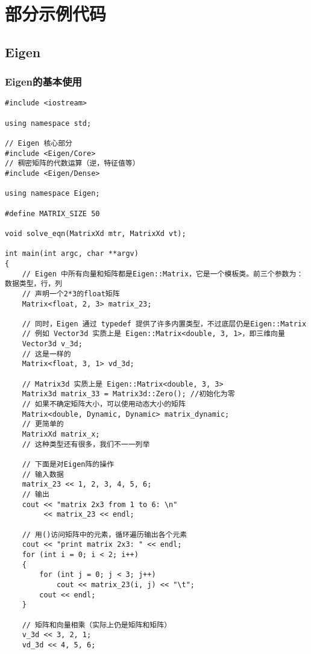 \chapter{部分示例代码}
\label{code}
\thispagestyle{empty}

\section{Eigen}
\label{Eigen}
\subsection{Eigen的基本使用}
\label{Eigen1}
\begin{lstlisting}[style=C++]
#include <iostream>

using namespace std;

// Eigen 核心部分
#include <Eigen/Core>
// 稠密矩阵的代数运算（逆，特征值等）
#include <Eigen/Dense>

using namespace Eigen;

#define MATRIX_SIZE 50

void solve_eqn(MatrixXd mtr, MatrixXd vt);

int main(int argc, char **argv)
{
    // Eigen 中所有向量和矩阵都是Eigen::Matrix，它是一个模板类。前三个参数为：数据类型，行，列
    // 声明一个2*3的float矩阵
    Matrix<float, 2, 3> matrix_23;

    // 同时，Eigen 通过 typedef 提供了许多内置类型，不过底层仍是Eigen::Matrix
    // 例如 Vector3d 实质上是 Eigen::Matrix<double, 3, 1>，即三维向量
    Vector3d v_3d;
    // 这是一样的
    Matrix<float, 3, 1> vd_3d;

    // Matrix3d 实质上是 Eigen::Matrix<double, 3, 3>
    Matrix3d matrix_33 = Matrix3d::Zero(); //初始化为零
    // 如果不确定矩阵大小，可以使用动态大小的矩阵
    Matrix<double, Dynamic, Dynamic> matrix_dynamic;
    // 更简单的
    MatrixXd matrix_x;
    // 这种类型还有很多，我们不一一列举

    // 下面是对Eigen阵的操作
    // 输入数据
    matrix_23 << 1, 2, 3, 4, 5, 6;
    // 输出
    cout << "matrix 2x3 from 1 to 6: \n"
         << matrix_23 << endl;

    // 用()访问矩阵中的元素，循环遍历输出各个元素
    cout << "print matrix 2x3: " << endl;
    for (int i = 0; i < 2; i++)
    {
        for (int j = 0; j < 3; j++)
            cout << matrix_23(i, j) << "\t";
        cout << endl;
    }

    // 矩阵和向量相乘（实际上仍是矩阵和矩阵）
    v_3d << 3, 2, 1;
    vd_3d << 4, 5, 6;


\end{lstlisting}
